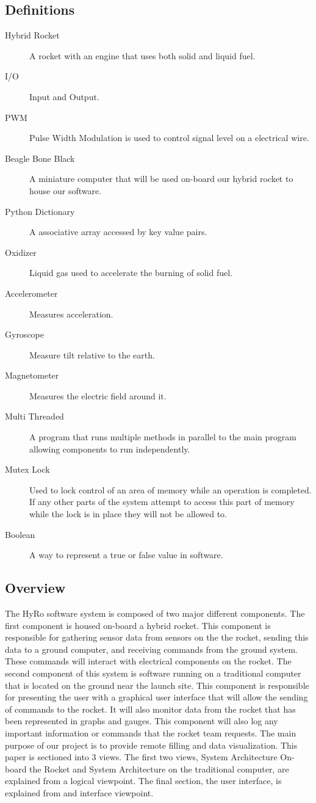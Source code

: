 \documentclass[10pt,draftclsnofoot,onecolumn,compsoc]{IEEEtran}
\begin{document}
\subsection{Definitions}
\begin{description}
	\item[Hybrid Rocket] A rocket with an engine that uses both solid and liquid fuel.
	\item[I/O] Input and Output.
	\item[PWM] Pulse Width Modulation is used to control signal level on a electrical wire.
	\item[Beagle Bone Black] A miniature computer that will be used on-board our hybrid rocket to house our software.
	\item[Python Dictionary] A associative array accessed by key value pairs.
	\item[Oxidizer] Liquid gas used to accelerate the burning of solid fuel.
	\item[Accelerometer] Measures acceleration.
	\item[Gyroscope] Measure tilt relative to the earth.
	\item[Magnetometer] Measures the electric field around it.
	\item[Multi Threaded] A program that runs multiple methods in parallel to the main program allowing components to run independently.
	\item[Mutex Lock] Used to lock control of an area of memory while an operation is completed. If any other parts of the system attempt to access this part of memory while the lock is in place they will not be allowed to.
	\item[Boolean] A way to represent a true or false value in software.
\end{description}
\subsection{Overview}
The HyRo software system is composed of two major different components. The first component is housed on-board a hybrid rocket. This component is responsible for gathering sensor data from sensors on the the rocket, sending this data to a ground computer, and receiving commands from the ground system. These commands will interact with electrical components on the rocket. The second component of this system is software running on a traditional computer that is located on the ground near the launch site. This component is responsible for presenting the user with a graphical user interface that will allow the sending of commands to the rocket. It will also monitor data from the rocket that has been represented in graphs and gauges. This component will also log any important information or commands that the rocket team requests. The main purpose of our project is to provide remote filling and data visualization. This paper is sectioned into 3 views. The first two views, System Architecture On-board the Rocket and System Architecture on the traditional computer, are explained from a logical viewpoint. The final section, the user interface, is explained from and interface viewpoint.
\end{document}
